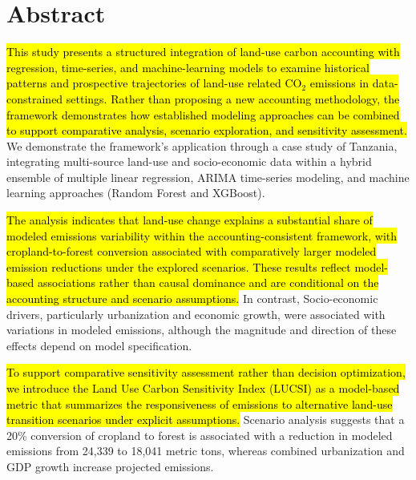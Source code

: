 \documentclass[10pt,letterpaper]{article}
\begin{document}

%


\section*{Abstract}

\hl{This study presents a structured integration of land-use carbon accounting with regression, time-series, and machine-learning models to examine historical patterns and prospective trajectories of land-use related CO$_2$ emissions in data-constrained settings. Rather than proposing a new accounting methodology, the framework demonstrates how established modeling approaches can be combined to support comparative analysis, scenario exploration, and sensitivity assessment.} We demonstrate the framework's application through a case study of Tanzania, integrating multi-source land-use and socio-economic data within a hybrid ensemble of multiple linear regression, ARIMA time-series modeling, and machine learning approaches (Random Forest and XGBoost).

\hl{The analysis indicates that land-use change explains a substantial share of modeled emissions variability within the accounting-consistent framework, with cropland-to-forest conversion associated with comparatively larger modeled emission reductions under the explored scenarios. These results reflect model-based associations rather than causal dominance and are conditional on the accounting structure and scenario assumptions.} In contrast, Socio-economic drivers, particularly urbanization and economic growth, were associated with variations in modeled emissions, although the magnitude and direction of these effects depend on model specification.




\hl{To support comparative sensitivity assessment rather than decision optimization, we introduce the Land Use Carbon Sensitivity Index (LUCSI) as a model-based metric that summarizes the responsiveness of emissions to alternative land-use transition scenarios under explicit assumptions.} Scenario analysis suggests that a 20\% conversion of cropland to forest is associated with a reduction in modeled emissions from 24,339 to 18,041 metric tons, whereas combined urbanization and GDP growth increase projected emissions.
\end{document}
